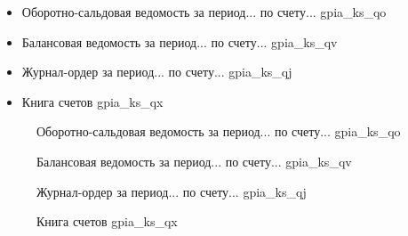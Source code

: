 \begin{itemize}
    \item Оборотно-сальдовая ведомость за период... по счету... gpia\_ks\_qo
    \item Балансовая ведомость за период... по счету...  gpia\_ks\_qv
    \item Журнал-ордер за период... по счету... gpia\_ks\_qj
    \item Книга счетов gpia\_ks\_qx
\end{itemize}

\begin{figure}[!htb]
    \centering
    \caption{Оборотно-сальдовая ведомость за период... по счету... gpia\_ks\_qo}
    \label{fig:gpia_ks_qo}
\end{figure}

\begin{figure}[!htb]
    \centering
    \caption{Балансовая ведомость за период... по счету... gpia\_ks\_qv}
    \label{fig:gpia_ks_qv}
\end{figure}

\begin{figure}[!htb]
    \centering
    \caption{Журнал-ордер за период... по счету... gpia\_ks\_qj}
    \label{fig:gpia_ks_qj}
\end{figure}

\begin{figure}[!htb]
    \centering
    \caption{Книга счетов  gpia\_ks\_qx}
    \label{fig:gpia_ks_qx}
\end{figure}